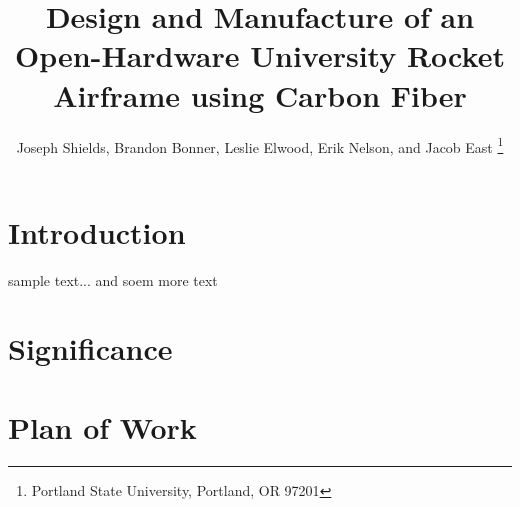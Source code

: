 \documentclass{aiaa-tc}%
\title{Design and Manufacture of an Open-Hardware 
 	University Rocket Airframe using Carbon Fiber}
\author{
Joseph Shields, Brandon Bonner, Leslie Elwood, Erik Nelson, and Jacob East
	\thanks{Portland State University, Portland, OR 97201}
 }
\begin{document}
\maketitle
\begin{abstract}

\end{abstract}


\section{Introduction}
sample text... and soem more text
\section{Significance}


\section{Plan of Work}
\end{document}

